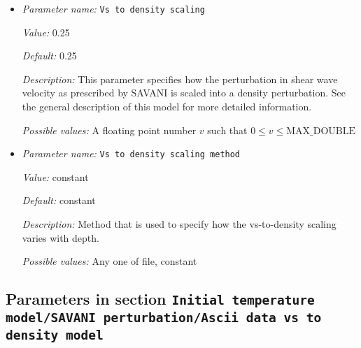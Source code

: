 \begin{itemize}
{\it Default:} false


{\it Description:} Option to take the thermal expansion coefficient from the material model instead of from what is specified in this section.


{\it Possible values:} A boolean value (true or false)
\item {\it Parameter name:} {\tt Vs to density scaling}
\label{parameters:Initial temperature model/SAVANI perturbation/Vs to density scaling}


{\it Value:} 0.25


{\it Default:} 0.25


{\it Description:} This parameter specifies how the perturbation in shear wave velocity as prescribed by SAVANI is scaled into a density perturbation. See the general description of this model for more detailed information.


{\it Possible values:} A floating point number $v$ such that $0 \leq v \leq \text{MAX\_DOUBLE}$
\item {\it Parameter name:} {\tt Vs to density scaling method}
\label{parameters:Initial temperature model/SAVANI perturbation/Vs to density scaling method}


{\it Value:} constant


{\it Default:} constant


{\it Description:} Method that is used to specify how the vs-to-density scaling varies with depth.


{\it Possible values:} Any one of file, constant
\end{itemize}



\subsection{Parameters in section \tt Initial temperature model/SAVANI perturbation/Ascii data vs to density model}
\label{parameters:Initial_20temperature_20model/SAVANI_20perturbation/Ascii_20data_20vs_20to_20density_20model}

